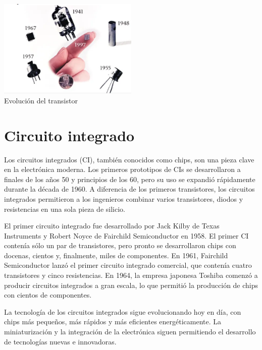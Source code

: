 \documentclass{article}
\begin{document}
\begin{center}
    \includegraphics[width=0.5\textwidth]{res/evol_transistor.png}\\
    Evolución del transistor
\end{center}



\section*{Circuito integrado}

Los circuitos integrados (CI), también conocidos como chips, son una pieza clave en la electrónica moderna. 
Los primeros prototipos de CIs se desarrollaron a finales de los años 50 y principios de los 60, 
pero su uso se expandió rápidamente durante la década de 1960. A diferencia de los primeros transistores, 
los circuitos integrados permitieron a los ingenieros combinar varios transistores, diodos y resistencias 
en una sola pieza de silicio.

El primer circuito integrado fue desarrollado por Jack Kilby de Texas Instruments 
y Robert Noyce de Fairchild Semiconductor en 1958. El primer CI contenía sólo un par de transistores, 
pero pronto se desarrollaron chips con docenas, cientos y, finalmente, miles de componentes. 
En 1961, Fairchild Semiconductor lanzó el primer circuito integrado comercial, que contenía 
cuatro transistores y cinco resistencias. En 1964, la empresa japonesa Toshiba comenzó a 
producir circuitos integrados a gran escala, lo que permitió la producción de chips con 
cientos de componentes.

La tecnología de los circuitos integrados sigue evolucionando hoy en día, con chips más pequeños, más rápidos 
y más eficientes energéticamente. La miniaturización y la integración de la electrónica siguen permitiendo 
el desarrollo de tecnologías nuevas e innovadoras.
\end{document}
